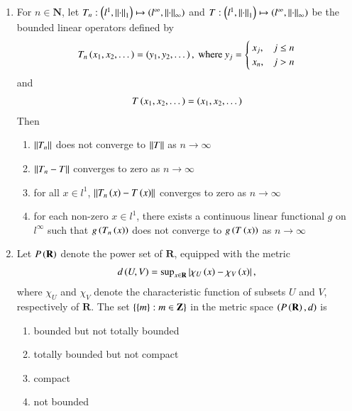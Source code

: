 \documentclass[journal]{IEEEtran}
\numberwithin{equation}{enumi}
\numberwithin{figure}{enumi}
\begin{document}
\begin{enumerate}
		\item 
			For $n \in \mathbf{N}$, let $T_n: \left(l^1,\left\lVert\cdot\right\rVert_1\right) \mapsto \left(l^{\infty}, \left\lVert\cdot\right\rVert_{\infty}\right)$ and $T: \left(l^1,\left\lVert\cdot\right\rVert_1\right) \mapsto \left(l^{\infty}, \left\lVert\cdot\right\rVert_{\infty}\right)$ be the bounded linear operators defined by 
		\begin{align*}
			T_n\left(x_1,x_2,\dots\right) = \left(y_1, y_2, \dots\right), \text{ where } y_j = 
			\begin{cases}
				x_j ,& j \leq n\\
				x_n ,& j > n
			\end{cases}\\
		\end{align*}
		and 
		\begin{align*}
			T\left(x_1, x_2, \dots\right) = \left(x_1, x_2, \dots\right)
		\end{align*}
		Then 
		\begin{enumerate}
			\item $\left\lVert T_n\right\rVert$ does not converge to $\left\lVert T\right\rVert$ as $n\to \infty$
			\item $\left\lVert T_n - T\right\rVert$ converges to zero as $n\to \infty$
			\item for all $x \in l^1$, $\left\lVert T_n\left(x\right) - T\left(x\right)\right\rVert$ converges to zero as $n\to \infty$
			\item for each non-zero $x \in l^1$, there exists a continuous linear functional $g$ on $l^{\infty}$ such that $g\left(T_n\left(x\right)\right)$ does not converge to $g\left(T\left(x\right)\right)$ as $n\to \infty$
		\end{enumerate}

		\item 
		Let $P\left(\mathbf{R}\right)$ denote the power set of $\mathbf{R}$, equipped with the metric 
		\begin{align*}
			d\left(U,V\right) = \text{sup}_{x \in \mathbf{R}}\left\vert\chi_U\left(x\right) - \chi_V\left(x\right)\right\vert,
		\end{align*}
		where $\chi_U$ and $\chi_V$ denote the characteristic function of subsets $U$ and $V$, respectively of $\mathbf{R}$. The set $\left\{\left\{m\right\}:m \in \mathbf{Z}\right\}$ in the metric space $\left(P\left(\mathbf{R}\right), d\right)$ is 
		\begin{multicols}{2}
			\begin{enumerate}
				\item bounded but not totally bounded 
				\item totally bounded but not compact
				\item compact 
				\item not bounded
			\end{enumerate}
		\end{multicols}
	\end{enumerate}
\end{document}
